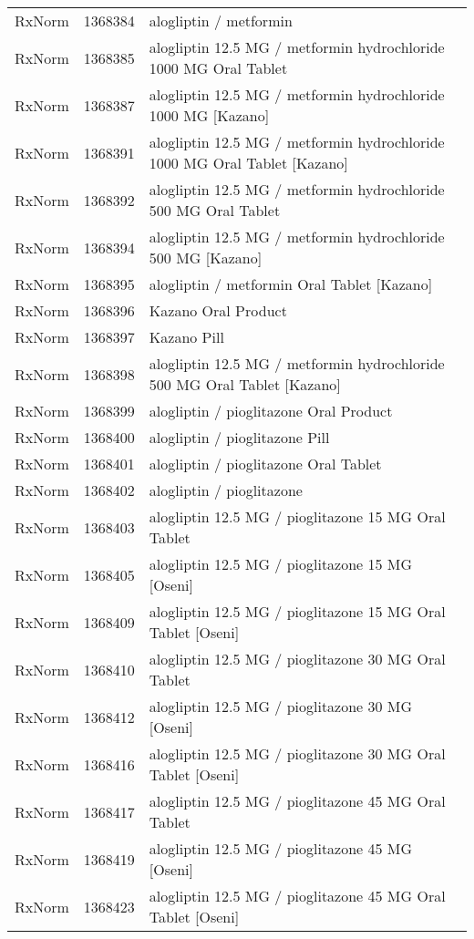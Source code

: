 \begin{longtable}{p{}p{}p{}}
  RxNorm & 1368384 & alogliptin / metformin \\ 
  RxNorm & 1368385 & alogliptin 12.5 MG / metformin hydrochloride 1000 MG Oral Tablet \\ 
  RxNorm & 1368387 & alogliptin 12.5 MG / metformin hydrochloride 1000 MG [Kazano] \\ 
  RxNorm & 1368391 & alogliptin 12.5 MG / metformin hydrochloride 1000 MG Oral Tablet [Kazano] \\ 
  RxNorm & 1368392 & alogliptin 12.5 MG / metformin hydrochloride 500 MG Oral Tablet \\ 
  RxNorm & 1368394 & alogliptin 12.5 MG / metformin hydrochloride 500 MG [Kazano] \\ 
  RxNorm & 1368395 & alogliptin / metformin Oral Tablet [Kazano] \\ 
  RxNorm & 1368396 & Kazano Oral Product \\ 
  RxNorm & 1368397 & Kazano Pill \\ 
  RxNorm & 1368398 & alogliptin 12.5 MG / metformin hydrochloride 500 MG Oral Tablet [Kazano] \\ 
  RxNorm & 1368399 & alogliptin / pioglitazone Oral Product \\ 
  RxNorm & 1368400 & alogliptin / pioglitazone Pill \\ 
  RxNorm & 1368401 & alogliptin / pioglitazone Oral Tablet \\ 
  RxNorm & 1368402 & alogliptin / pioglitazone \\ 
  RxNorm & 1368403 & alogliptin 12.5 MG / pioglitazone 15 MG Oral Tablet \\ 
  RxNorm & 1368405 & alogliptin 12.5 MG / pioglitazone 15 MG [Oseni] \\ 
  RxNorm & 1368409 & alogliptin 12.5 MG / pioglitazone 15 MG Oral Tablet [Oseni] \\ 
  RxNorm & 1368410 & alogliptin 12.5 MG / pioglitazone 30 MG Oral Tablet \\ 
  RxNorm & 1368412 & alogliptin 12.5 MG / pioglitazone 30 MG [Oseni] \\ 
  RxNorm & 1368416 & alogliptin 12.5 MG / pioglitazone 30 MG Oral Tablet [Oseni] \\ 
  RxNorm & 1368417 & alogliptin 12.5 MG / pioglitazone 45 MG Oral Tablet \\ 
  RxNorm & 1368419 & alogliptin 12.5 MG / pioglitazone 45 MG [Oseni] \\ 
  RxNorm & 1368423 & alogliptin 12.5 MG / pioglitazone 45 MG Oral Tablet [Oseni] \\ 

\end{longtable}
